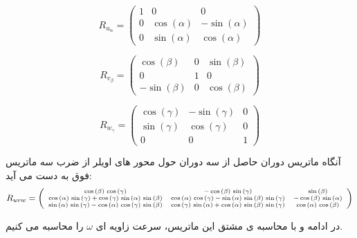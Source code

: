 \[
R_{u_\alpha} = \left(
\begin{array}{ccc}
	1 & 0 & 0 \\
	0 & \cos \left(\alpha\right) & -\sin \left(\alpha\right) \\
	0 & \sin \left(\alpha\right) & \cos \left(\alpha\right)
\end{array}
\right)
\]

\[
R_{v_\beta} = \left(
\begin{array}{ccc}
	\cos \left(\beta \right) & 0 & \sin \left(\beta \right) \\
	0 & 1 & 0 \\
	-\sin \left(\beta \right) & 0 & \cos \left(\beta \right)
\end{array}
\right)
\]

\[
R_{w_\gamma} = \left(
\begin{array}{ccc}
	\cos \left(\gamma \right) & -\sin \left(\gamma \right) & 0 \\
	\sin \left(\gamma \right) & \cos \left(\gamma \right) & 0 \\
	0 & 0 & 1
\end{array}
\right)
\]

آنگاه ماتریس دوران حاصل از سه دوران حول محور های اویلر از ضرب سه ماتریس فوق به دست می آید:
\[
\scriptsize
R_{uvw} = \left(
\begin{array}{ccc}
	\cos \left(\beta\right)\,\cos \left(\gamma\right) & -\cos \left(\beta\right)\,\sin \left(\gamma\right) & \sin \left(\beta\right) \\
	\cos \left(\alpha\right)\,\sin \left(\gamma\right) + \cos \left(\gamma\right)\,\sin \left(\alpha\right)\,\sin \left(\beta\right) & \cos \left(\alpha\right)\,\cos \left(\gamma\right) - \sin \left(\alpha\right)\,\sin \left(\beta\right)\,\sin \left(\gamma\right) & -\cos \left(\beta\right)\,\sin \left(\alpha\right) \\
	\sin \left(\alpha\right)\,\sin \left(\gamma\right) - \cos \left(\alpha\right)\,\cos \left(\gamma\right)\,\sin \left(\beta\right) & \cos \left(\gamma\right)\,\sin \left(\alpha\right) + \cos \left(\alpha\right)\,\sin \left(\beta\right)\,\sin \left(\gamma\right) & \cos \left(\alpha\right)\,\cos \left(\beta\right)
\end{array}
\right)
\]

در ادامه و با محاسبه ی مشتق این ماتریس، سرعت زاویه ای $\omega$ را محاسبه می کنیم.
\\


